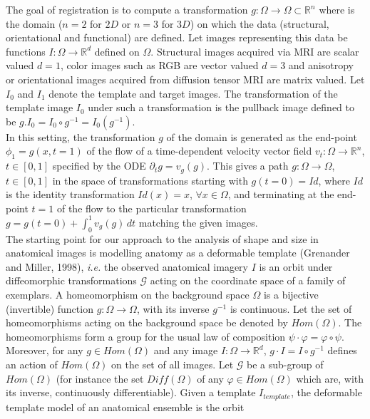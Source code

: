 \documentclass[final, paper=letter,5p,times,twocolumn]{elsarticle}
\theoremstyle{definition}
\begin{document}
The goal of registration is to compute a transformation $g:\Omega \rightarrow \Omega \subset \mathbb{R}^{n}$ where is the domain ($n = 2$ for $2D$ or $n = 3$ for $3D$) on which the data (structural, orientational and functional) are defined. Let images representing this data be functions $I: \Omega \rightarrow \mathbb{R}^{d}$ defined on $\Omega$. Structural images acquired via MRI are scalar valued $d = 1$, color images such as RGB are vector valued $d = 3$ and anisotropy or orientational images acquired from diffusion tensor MRI are matrix valued. Let $I_{0}$ and $I_{1}$ denote the template and target images. The transformation of the template image $I_{0}$ under such a transformation is the pullback image defined to be $g.I_{0} = I_{0} \circ g^{-1} = I_{0}(g^{-1})$.\\
In this setting, the transformation $g$ of the domain is generated as the end-point $\phi_{1} = g(x,t=1)$ of the flow of a time-dependent velocity vector field $v_{t}: \Omega \rightarrow \mathbb{R}^{n}$, $t \in [0, 1]$ specified by the ODE $\partial_{t} g = v_{g}(g)$. This gives a path $g: \Omega \rightarrow \Omega$, $t \in [0, 1]$ in the space of transformations starting with $g(t = 0) = Id$, where $Id$ is the identity transformation $Id(x) = x$, $\forall x \in \Omega$, and terminating at the end-point $t = 1$ of the flow to the particular transformation $g = g( t = 0 ) + \int_{0}^{1} v_{g}(g) \, dt$ matching the given images.\\
The  starting  point  for  our approach to the analysis of shape and size in anatomical images is modelling anatomy  as  a  deformable  template  (Grenander  and Miller, 1998), {\it i.e.} the observed anatomical imagery $I$ is an orbit under diffeomorphic transformations $\mathcal{G}$ acting on the coordinate space of a family of exemplars. A homeomorphism on the background space $\Omega$ is a bijective (invertible) function $g: \Omega \rightarrow \Omega$, with its inverse $g^{-1}$ is continuous. Let the set of homeomorphisms acting on the background space be denoted by $Hom(\Omega)$. The homeomorphisms form a group for the usual law of composition $\psi \cdot \varphi = \varphi \circ \psi$. Moreover, for any $g \in Hom(\Omega)$ and any image $I: \Omega \rightarrow \mathbb{R}^{d}$, $g \cdot I = I \circ g^{-1}$ defines an action of $Hom(\Omega)$ on the set of all images. Let $\mathcal{G}$ be a sub-group of $Hom(\Omega)$ (for instance the set $Diff(\Omega)$ of any $\varphi \in Hom(\Omega)$ which are, with its inverse, continuously differentiable). Given a template $I_{template}$, the deformable template model of an anatomical ensemble is the orbit
\end{document}
